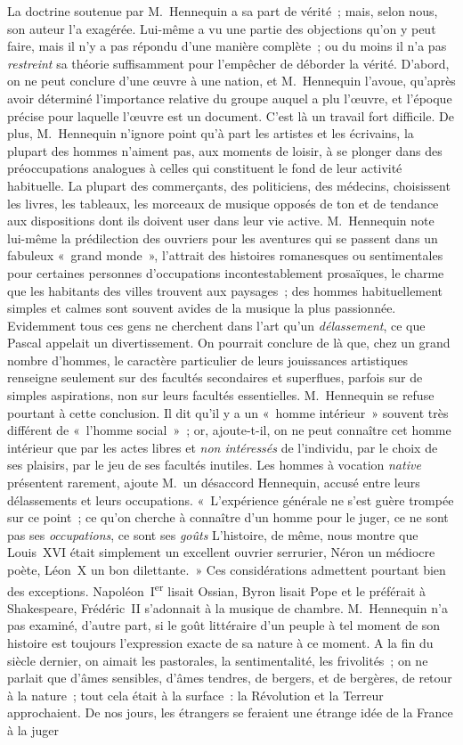 \documentclass[french,twoside]{book} %
\begin{document}
La doctrine soutenue par M. Hennequin a sa part de vérité ; mais, selon nous, son auteur l’a exagérée. Lui-même a vu une partie des objections qu’on y peut faire, mais il n’y a pas répondu d’une manière complète ; ou du moins il n’a pas \emph{restreint} sa théorie suffisamment pour l’empêcher de déborder la vérité. D’abord, on ne peut conclure d’une œuvre à une nation, et M. Hennequin l’avoue, qu’après avoir déterminé l’importance relative du groupe auquel a plu l’œuvre, et l’époque précise pour laquelle l’œuvre est un document. C’est là un travail fort difficile. De plus, M. Hennequin n’ignore point qu’à part les artistes et les écrivains, la plupart des hommes n’aiment pas, aux moments de loisir, à se plonger dans des préoccupations analogues à celles qui constituent le fond de leur activité habituelle. La plupart des commerçants, des politiciens, des médecins, choisissent les livres, les tableaux, les morceaux de musique opposés de ton et de tendance aux dispositions dont ils doivent user dans leur vie active. M. Hennequin note lui-même la prédilection des ouvriers pour les aventures qui se passent dans un fabuleux « grand monde », l’attrait des histoires romanesques ou sentimentales pour certaines personnes d’occupations incontestablement prosaïques, le charme que les habitants des villes trouvent aux paysages ; des hommes habituellement simples et calmes sont souvent avides de la musique la plus passionnée. Evidemment tous ces gens ne cherchent dans l’art qu’un \emph{délassement}, ce que Pascal appelait un divertissement. On pourrait conclure de là que, chez un grand nombre d’hommes, le caractère particulier de leurs jouissances artistiques renseigne seulement sur des facultés secondaires et superflues, parfois sur de simples aspirations, non sur leurs facultés essentielles. M. Hennequin se refuse pourtant à cette conclusion. Il dit qu’il y a un « homme intérieur » souvent très différent de « l’homme social » ; or, ajoute-t-il, on ne peut connaître cet homme intérieur que par les actes libres et \emph{non intéressés} de l’individu, par le choix de ses plaisirs, par le jeu de ses facultés inutiles. Les hommes à vocation \emph{native} présentent rarement, ajoute M. un désaccord Hennequin, accusé entre leurs délassements et leurs occupations. « L’expérience générale ne s’est guère trompée sur ce point ; ce qu’on cherche à connaître d’un homme pour le juger, ce ne sont pas ses \emph{occupations}, ce sont ses \emph{goûts} L’histoire, de même, nous montre que Louis XVI était simplement un excellent ouvrier serrurier, Néron un médiocre poète, Léon X un bon dilettante. » Ces considérations admettent pourtant bien des exceptions. Napoléon I\textsuperscript{er} lisait Ossian, Byron lisait Pope et le préférait à Shakespeare, Frédéric II s’adonnait à la musique de chambre. M. Hennequin n’a pas examiné, d’autre part, si le goût littéraire d’un peuple à tel moment de son histoire est toujours l’expression exacte de sa nature à ce moment. A la fin du siècle dernier, on aimait les pastorales, la sentimentalité, les frivolités ; on ne parlait que d’âmes sensibles, d’âmes tendres, de bergers, et de bergères, de retour à la nature ; tout cela était à la surface : la Révolution et la Terreur approchaient. De nos jours, les étrangers se feraient une étrange idée de la France à la juger 
\end{document}
